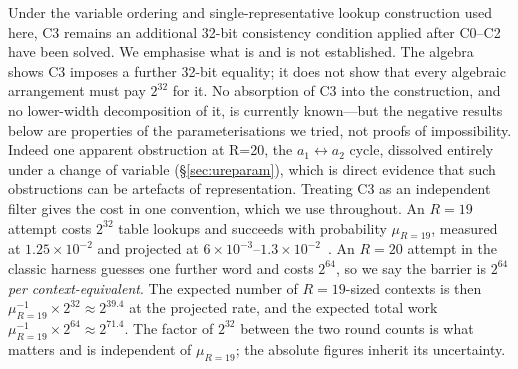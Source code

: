 \documentclass[11pt,a4paper]{article}
\begin{document}
Under the variable ordering and single-representative lookup construction used
here, C3 remains an additional 32-bit consistency condition applied after
C0--C2 have been solved.  We emphasise what is and is not established.  The
algebra shows C3 imposes a further 32-bit equality; it does not show that every
algebraic arrangement must pay $2^{32}$ for it.  No absorption of C3 into the
construction, and no lower-width decomposition of it, is currently known---but
the negative results below are properties of the parameterisations we tried,
not proofs of impossibility.  Indeed one apparent obstruction at R=20, the
$a_1\!\leftrightarrow\!a_2$ cycle, dissolved entirely under a change of
variable (\S\ref{sec:ureparam}), which is direct evidence that such
obstructions can be artefacts of representation.  Treating C3 as an independent
filter gives the cost in one convention, which we use throughout.  An
$R{=}19$ attempt costs $2^{32}$ table lookups and succeeds with probability
$\mu_{R=19}$, measured at $1.25\times10^{-2}$ and projected at
$6\times10^{-3}$--$1.3\times10^{-2}$~\cite[\S5.6]{Basra2026R19}.  An
$R{=}20$ attempt in the classic harness guesses one further word and costs
$2^{64}$, so we say the barrier is \emph{$2^{64}$ per context-equivalent}.
The expected number of $R{=}19$-sized contexts is then
$\mu_{R=19}^{-1}\times 2^{32}\approx 2^{39.4}$ at the projected rate, and
the expected total work $\mu_{R=19}^{-1}\times 2^{64}\approx 2^{71.4}$.
The factor of $2^{32}$ between the two round counts is what matters and is
independent of $\mu_{R=19}$; the absolute figures inherit its uncertainty.
\end{document}
